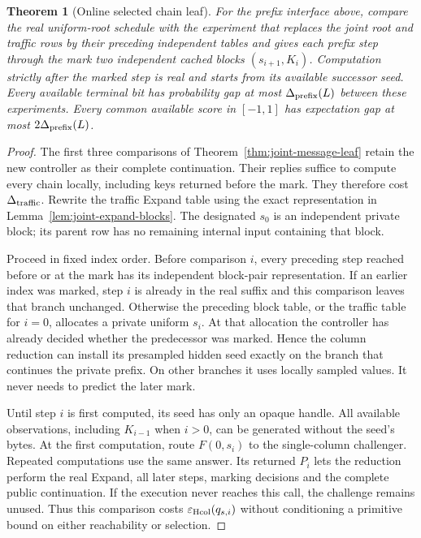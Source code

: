 \documentclass[pdflatex]{sn-jnl}
\theoremstyle{thmstyleone}
\newtheorem{theorem}{Theorem}[section]
\theoremstyle{thmstylethree}
\theoremstyle{thmstyletwo}
\begin{document}
\begin{theorem}[Online selected chain leaf]
\label{thm:online-chain-leaf}
For the prefix interface above, compare the real uniform-root schedule
with the experiment that replaces the joint root and traffic rows by
their preceding independent tables and gives each prefix step through
the mark two independent cached blocks $(s_{i+1},K_i)$. Computation
strictly after the marked step is real and starts from its available
successor seed. Every available terminal bit has probability gap at
most $\Delta_{\rm prefix}(L)$ between these experiments. Every common
available score in $[-1,1]$ has expectation gap at most
$2\Delta_{\rm prefix}(L)$.
\end{theorem}
\begin{proof}
The first three comparisons of
Theorem~\ref{thm:joint-message-leaf} retain the new controller as their
complete continuation. Their replies suffice to compute every chain
locally, including keys returned before the mark. They therefore cost
$\Delta_{\rm traffic}$. Rewrite the traffic Expand table using the exact
representation in Lemma~\ref{lem:joint-expand-blocks}.
The designated $s_0$ is an independent private block; its parent row
has no remaining internal input containing that block.

Proceed in fixed index order. Before comparison $i$, every preceding
step reached before or at the mark has its independent block-pair
representation. If an earlier index was marked, step $i$ is already
in the real suffix and this comparison leaves that branch unchanged.
Otherwise the preceding block table, or the traffic table for $i=0$,
allocates a private uniform $s_i$. At that allocation the controller
has already decided whether the predecessor was marked. Hence the
column reduction can install its presampled hidden seed exactly on
the branch that continues the private prefix. On other branches it
uses locally sampled values. It never needs to predict the later mark.

Until step $i$ is first computed, its seed has only an opaque handle.
All available observations, including $K_{i-1}$ when $i>0$, can be
generated without the seed's bytes. At the first computation, route $F(0,s_i)$
to the single-column challenger. Repeated computations use the same
answer. Its returned $P_i$ lets the reduction perform the real Expand,
all later steps, marking decisions and the complete public continuation.
If the execution never reaches this call, the challenge remains unused.
Thus this comparison costs $\varepsilon_{\rm Hcol}(q_{s,i})$ without
conditioning a primitive bound on either reachability or selection.


\end{proof}
\end{document}
